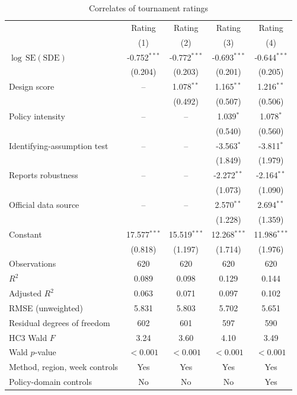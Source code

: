 \begin{table}[htbp]\centering\small
\caption{Correlates of tournament ratings}\label{tab:quality_regressions}
\setlength{\tabcolsep}{4pt}
\begin{tabular}{lcccc}\toprule
 & Rating & Rating & Rating & Rating \\
 & (1) & (2) & (3) & (4) \\
\midrule
$\log\,\mathrm{SE}(\mathrm{SDE})$ & -0.752$^{***}$ & -0.772$^{***}$ & -0.693$^{***}$ & -0.644$^{***}$ \\
 & (0.204) & (0.203) & (0.201) & (0.205) \\
Design score & -- & 1.078$^{**}$ & 1.165$^{**}$ & 1.216$^{**}$ \\
 &  & (0.492) & (0.507) & (0.506) \\
Policy intensity & -- & -- & 1.039$^{*}$ & 1.078$^{*}$ \\
 &  &  & (0.540) & (0.560) \\
Identifying-assumption test & -- & -- & -3.563$^{*}$ & -3.811$^{*}$ \\
 &  &  & (1.849) & (1.979) \\
Reports robustness & -- & -- & -2.272$^{**}$ & -2.164$^{**}$ \\
 &  &  & (1.073) & (1.090) \\
Official data source & -- & -- & 2.570$^{**}$ & 2.694$^{**}$ \\
 &  &  & (1.228) & (1.359) \\
Constant & 17.577$^{***}$ & 15.519$^{***}$ & 12.268$^{***}$ & 11.986$^{***}$ \\
 & (0.818) & (1.197) & (1.714) & (1.976) \\
\midrule Observations & 620 & 620 & 620 & 620 \\
$R^2$ & 0.089 & 0.098 & 0.129 & 0.144 \\
Adjusted $R^2$ & 0.063 & 0.071 & 0.097 & 0.102 \\
RMSE (unweighted) & 5.831 & 5.803 & 5.702 & 5.651 \\
Residual degrees of freedom & 602 & 601 & 597 & 590 \\
HC3 Wald $F$ & 3.24 & 3.60 & 4.10 & 3.49 \\
Wald $p$-value & $<0.001$ & $<0.001$ & $<0.001$ & $<0.001$ \\
Method, region, week controls & Yes & Yes & Yes & Yes \\
Policy-domain controls & No & No & No & Yes \\
\bottomrule\end{tabular}

\end{table}
